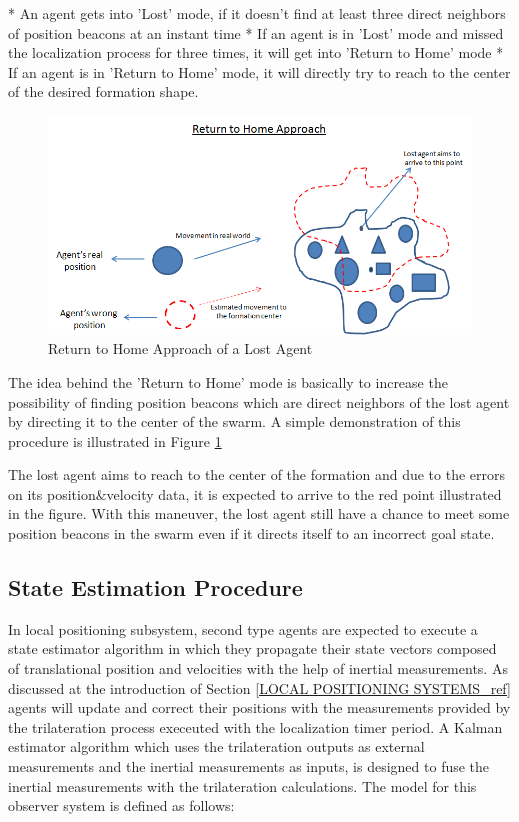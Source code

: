 	* An agent gets into 'Lost' mode, if it doesn't find at least three direct neighbors of position beacons at an instant time \newline
	* If an agent is in 'Lost' mode and missed the localization process for three times, it will get into 'Return to Home' mode \newline
	* If an agent is in 'Return to Home' mode, it will directly try to reach to the center of the desired formation shape.
		
\begin{figure}[H]
\caption{Return to Home Approach of a Lost Agent} \label{return_home_ref}
\centering
\includegraphics[scale = 0.60]{return_home}
\end{figure}

The idea behind the 'Return to Home' mode is basically to increase the possibility of finding position beacons which are direct neighbors of the lost agent by directing it to the center of the swarm. A simple demonstration of this procedure is illustrated in Figure \ref{return_home_ref}
	
The lost agent aims to reach to the center of the formation and due to the errors on its position$\&$velocity data, it is expected to arrive to the red point illustrated in the figure. With this maneuver, the lost agent still have a chance to meet some position beacons in the swarm even if it directs itself to an incorrect goal state.
	
\subsection{State Estimation Procedure} \label{StateEstimationref}
In local positioning subsystem, second type agents are expected to execute a state estimator algorithm in which they propagate their state vectors composed of translational position and velocities with the help of inertial measurements. As discussed at the introduction of Section \ref{LOCAL POSITIONING SYSTEMS_ref} agents will update and correct their positions with the measurements provided by the trilateration process execeuted with the localization timer period. A Kalman estimator algorithm which uses the trilateration outputs as external measurements and the inertial measurements as inputs, is designed to fuse the inertial measurements with the trilateration calculations. The model for this observer system is defined as follows:
	
